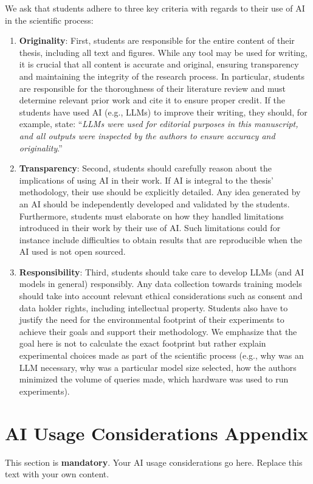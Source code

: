 We ask that students adhere to three key criteria with regards to their use of AI in the scientific process:
\begin{enumerate}
    \item \textbf{Originality}: First, students are responsible for the entire content of their thesis, including all text and figures. While any tool may be used for writing, it is crucial that all content is accurate and original, ensuring transparency and maintaining the integrity of the research process. In particular, students are responsible for the thoroughness of their literature review and must determine relevant prior work and cite it to ensure proper credit. If the students have used AI (e.g., LLMs) to improve their writing, they should, for example, state: ``\emph{LLMs were used for editorial purposes in this manuscript, and all outputs were inspected by the authors to ensure accuracy and originality}.''
    \item \textbf{Transparency}: Second, students should carefully reason about the implications of using AI in their work. If AI is integral to the thesis' methodology, their use should be explicitly detailed. Any idea generated by an AI should be independently developed and validated by the students. Furthermore, students must elaborate on how they handled limitations introduced in their work by their use of AI. Such limitations could for instance include difficulties to obtain results that are reproducible when the AI used is not open sourced.
    \item \textbf{Responsibility}: Third, students should take care to develop LLMs (and AI models in general) responsibly. Any data collection towards training models should take into account relevant ethical considerations such as consent and data holder rights, including intellectual property. Students also have to justify the need for the environmental footprint of their experiments to achieve their goals and support their methodology. We emphasize that the goal here is not to calculate the exact footprint but rather explain experimental choices made as part of the scientific process (e.g., why was an LLM necessary, why was a particular model size selected, how the authors minimized the volume of queries made, which hardware was used to run experiments).
\end{enumerate}

\section{AI Usage Considerations Appendix}
This section is \textbf{mandatory}. Your AI usage considerations go here. Replace this text with your own content.

